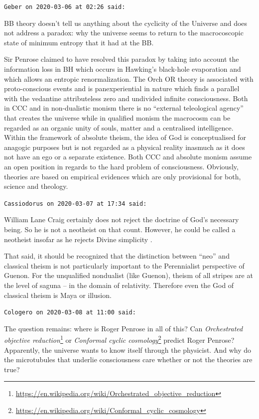 \begin{footnotesize}
\begin{sffamily}
\texttt{Geber on 2020-03-06 at 02:26 said:}

BB theory doesn't tell us anything about the cyclicity of the Universe and does not address a paradox: why the universe seems to return to the macrocoscopic state of minimum entropy that it had at the BB.

Sir Penrose claimed to have resolved this paradox by taking into account the information loss in BH which occurs in Hawking's black-hole evaporation and which allows an entropic renormalization. The Orch OR theory is associated with proto-conscious events and is panexperiential in nature which finds a parallel with the vedantine attributeless zero and undivided infinite consciousness. Both in CCC and in non-dualistic monism there is no ``external teleological agency'' that creates the universe while in qualified monism the macrocosm can be regarded as an organic unity of souls, matter and a centralised intelligence. Within the framework of absolute theism, the idea of God is conceptualised for anagogic purposes but is not regarded as a physical reality inasmuch as it does not have an ego or a separate existence. Both CCC and absolute monism assume an open position in regards to the hard problem of consciousness. Obviously, theories are based on empirical evidences which are only provisional for both, science and theology.

\hfill

\texttt{Cassiodorus on 2020-03-07 at 17:34 said:}

William Lane Craig certainly does not reject the doctrine of God's necessary being. So he is not a neotheist on that count. However, he could be called a neotheist insofar as he rejects Divine simplicity .

That said, it should be recognized that the distinction between ``neo'' and classical theism is not particularly important to the Perennialist perspective of Guenon. For the unqualified nondualist (like Guenon), theism of all stripes are at the level of saguna -- in the domain of relativity. Therefore even the God of classical theism is Maya or illusion.

\hfill

\texttt{Cologero on 2020-03-08 at 11:00 said:}

The question remains: where is Roger Penrose in all of this? Can \textit{Orchestrated objective reduction}\footnote{\url{https://en.wikipedia.org/wiki/Orchestrated_objective_reduction}} or
\textit{Conformal cyclic cosmology}\footnote{\url{https://en.wikipedia.org/wiki/Conformal_cyclic_cosmology}} predict Roger Penrose? Apparently, the universe wants to know itself through the physicist. And why do the microtubules that underlie consciousness care whether or not the theories are true?


\end{sffamily}
\end{footnotesize}

